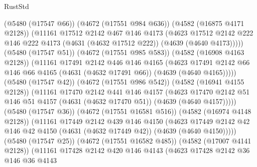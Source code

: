 \begin{lexlean}{RustStd}
\begin{coremodule}
                    (@5480 (@17547 @66))
                    (@4672 (@17551 @984 @636))
                    (@4582 (@16875 @4171 @2128))
                    (@11161
                      @17512
                      @2142
                      @467
                      @146
                      @4173
                      (@4623
                        @17512
                        @2142
                        @222
                        @146
                        @222
                        @4173
                        (@4631 (@4632 @17512 @222))
                        (@4639 (@4640 @4173)))))
                  (@5480 (@17547 @51))
                  (@4672 (@17551 @985 @583))
                  (@4582 (@16908 @4163 @2128))
                  (@11161
                    @17491
                    @2142
                    @446
                    @146
                    @4165
                    (@4623
                      @17491
                      @2142
                      @66
                      @146
                      @66
                      @4165
                      (@4631 (@4632 @17491 @66))
                      (@4639 (@4640 @4165)))))
                (@5480 (@17547 @42))
                (@4672 (@17551 @986 @542))
                (@4582 (@16941 @4155 @2128))
                (@11161
                  @17470
                  @2142
                  @441
                  @146
                  @4157
                  (@4623
                    @17470
                    @2142
                    @51
                    @146
                    @51
                    @4157
                    (@4631 (@4632 @17470 @51))
                    (@4639 (@4640 @4157)))))
              (@5480 (@17547 @36))
              (@4672 (@17551 @16581 @516))
              (@4582 (@16974 @4148 @2128))
              (@11161
                @17449
                @2142
                @439
                @146
                @4150
                (@4623
                  @17449
                  @2142
                  @42
                  @146
                  @42
                  @4150
                  (@4631 (@4632 @17449 @42))
                  (@4639 (@4640 @4150)))))
            (@5480 (@17547 @25))
            (@4672 (@17551 @16582 @485))
            (@4582 (@17007 @4141 @2128))
            (@11161
              @17428
              @2142
              @420
              @146
              @4143
              (@4623
                @17428
                @2142
                @36
                @146
                @36
                @4143

\end{coremodule}
\end{lexlean}
